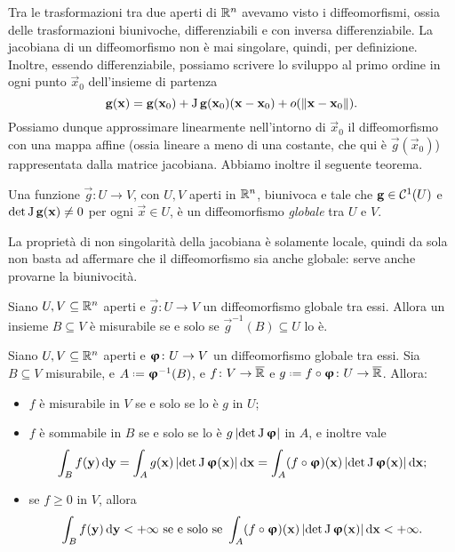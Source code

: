 Tra le trasformazioni tra due aperti di $\mathbb{R}^n$ avevamo visto i diffeomorfismi, ossia delle trasformazioni biunivoche, differenziabili e con inversa differenziabile. La jacobiana di un diffeomorfismo non è mai singolare, quindi, per definizione.
Inoltre, essendo differenziabile, possiamo scrivere lo sviluppo al primo ordine in ogni punto $\vec x_0$ dell'insieme di partenza
\begin{equation}
	\mathbf{g}(\mathbf{x})=\mathbf{g}(\mathbf{x}_0)+\operatorname{J}\mathbf{g}(\mathbf{x}_0)(\mathbf{x}-\mathbf{x}_0)+o(\left\|{\mathbf{x}-\mathbf{x}_0}\right\|).
\end{equation}
Possiamo dunque approssimare linearmente nell'intorno di $\vec x_0$ il diffeomorfismo con una mappa affine (ossia lineare a meno di una costante, che qui è $\vec g(\vec x_0)$) rappresentata dalla matrice jacobiana.
Abbiamo inoltre il seguente teorema.
\begin{teorema} \label{t:diffeomorfismo-globale}
	Una funzione $\vec g\colon U\to V$, con $U,V$ aperti in $\mathbb{R}^n$, biunivoca e tale che $\mathbf{g}\in\mathcal{C}^{{1}}(U)$ e $\det\operatorname{J}\mathbf{g}(\mathbf{x})\neq 0$ per ogni $\vec x\in U$, è un diffeomorfismo \emph{globale} tra $U$ e $V$.
\end{teorema}
La proprietà di non singolarità della jacobiana è solamente locale, quindi da sola non basta ad affermare che il diffeomorfismo sia anche globale: serve anche provarne la biunivocità.
\begin{teorema} \label{t:diffeomorfismo-misurabilita-insieme}
	Siano $U,V\subseteq\mathbb{R}^n$ aperti e $\vec g\colon U\to V$ un diffeomorfismo globale tra essi.
	Allora un insieme $B\subseteq V$ è misurabile se e solo se $\vec g^{-1}(B)\subseteq U$ lo è.
\end{teorema}
\begin{teorema} \label{t:composizione-diffeomorfismo-misurabile}
	Siano $U,V\subseteq\mathbb{R}^n$ aperti e $\bm{\upvarphi}\colon U\to V$ un diffeomorfismo globale tra essi.
	Sia $B\subseteq V$ misurabile, e $A\defeq\vphi^{-1}(B)$, e $f\colon V\to\overline{\mathbb{R}}$ e $g\defeq f\circ\vphi\colon U\to\Rex$.
	Allora:
	\begin{itemize}
		\item $f$ è misurabile in $V$ se e solo se lo è $g$ in $U$;
		\item $f$ è sommabile in $B$ se e solo se lo è $g\left|{\det\operatorname{J}\bm{\upvarphi}}\right|$ in $A$, e inoltre vale
			\begin{equation}
				\int_Bf(\mathbf{y})\,\textup{d}\mathbf{y}=\int_Ag(\mathbf{x})\left|{\det\operatorname{J}\bm{\upvarphi}(\mathbf{x})}\right|\textup{d}\mathbf{x}=\int_A(f\circ\bm{\upvarphi})(\mathbf{x})\left|{\det\operatorname{J}\bm{\upvarphi}(\mathbf{x})}\right|\textup{d}\mathbf{x};
			\end{equation}
		\item se $f\geq 0$ in $V$, allora
			\begin{equation}
				\int_Bf(\mathbf{y})\,\textup{d}\mathbf{y}<+\infty\text{ se e solo se }\int_A(f\circ\bm{\upvarphi})(\mathbf{x})\left|{\det\operatorname{J}\bm{\upvarphi}(\mathbf{x})}\right|\textup{d}\mathbf{x}<+\infty.
			\end{equation}
	\end{itemize}
\end{teorema}
